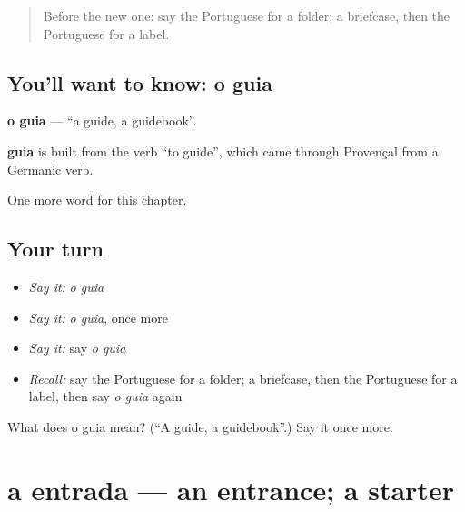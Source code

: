 \label{lesson:PT-C193-guia}



\begin{quote}
Before the new one: say the Portuguese for a folder; a briefcase, then the Portuguese for a label.
\end{quote}

\subsection*{You'll want to know: o guia}
\textbf{o guia} — \textquotedblleft{}a guide, a guidebook\textquotedblright{}.

\begin{cousinweb}
\textbf{guia} is built from the verb \textquotedblleft{}to guide\textquotedblright{}, which came through Provençal from a Germanic verb.
\end{cousinweb}

\begin{grammarlens}[title={What you've built}]
One more word for this chapter.
\end{grammarlens}

\subsection*{Your turn}
\begin{itemize}
\raggedright
  \item \emph{Say it:} \emph{o guia}
  \item \emph{Say it:} \emph{o guia}, once more
  \item \emph{Say it:} say \emph{o guia}
  \item \emph{Recall:} say the Portuguese for a folder; a briefcase, then the Portuguese for a label, then say \emph{o guia} again
\end{itemize}

\begin{tcolorbox}[breakable,colback=teal!4,colframe=teal!35!black,title={Before you move on}]
What does o guia mean? (\textquotedblleft{}A guide, a guidebook\textquotedblright{}.) Say it once more.
\end{tcolorbox}
\section[a entrada]{a entrada — an entrance; a starter}

\label{lesson:PT-C193-entrada}



